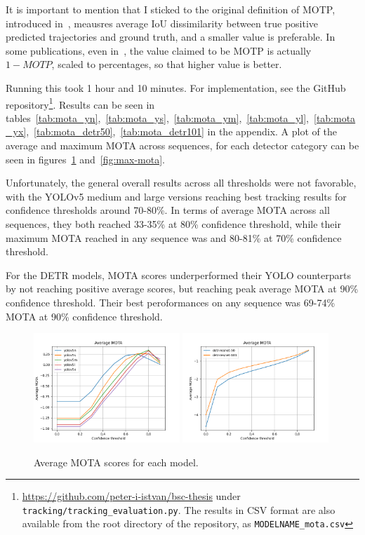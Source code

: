 It is important to mention that I sticked to the original definition of MOTP, introduced in~\cite{Bernardin2008}, meausres average IoU dissimilarity between true positive predicted trajectories and ground truth, and a smaller value is preferable. In some publications, even in~\cite{Bewley_2016}, the value claimed to be MOTP is actually $1-MOTP$, scaled to percentages, so that higher value is better.

Running this took 1 hour and 10 minutes. For implementation, see the GitHub repository\footnote{\url{https://github.com/peter-i-istvan/bsc-thesis} under \texttt{tracking/tracking\_evaluation.py}. The results in CSV format are also available from the root directory of the repository, as \texttt{MODELNAME\_mota.csv}}. Results can be seen in tables~\ref{tab:mota_yn},~\ref{tab:mota_ys},~\ref{tab:mota_ym},~\ref{tab:mota_yl},~\ref{tab:mota_yx},~\ref{tab:mota_detr50},~\ref{tab:mota_detr101} in the appendix. A plot of the average and maximum MOTA across sequences, for each detector category can be seen in figures~\ref{fig:avg-mota} and~\ref{fig:max-mota}.

Unfortunately, the general overall results across all thresholds were not favorable, with the YOLOv5 medium and large versions reaching best tracking results for confidence thresholds around 70-80\%. In terms of average MOTA across all sequences, they both reached 33-35\% at 80\% confidence threshold, while their maximum MOTA reached in any sequence was and 80-81\% at 70\% confidence threshold.

For the DETR models, MOTA scores underperformed their YOLO counterparts by not reaching positive average scores, but reaching peak average MOTA at 90\% confidence threshold. Their best peroformances on any sequence was 69-74\% MOTA at 90\% confidence threshold.

\begin{figure}[h]
    \includegraphics[width=0.49\textwidth]{figures/yolo_mota.png}
    \includegraphics[width=0.49\textwidth]{figures/detr_mota.png}
    \caption{Average MOTA scores for each model.}
    \label{fig:avg-mota}
\end{figure}

